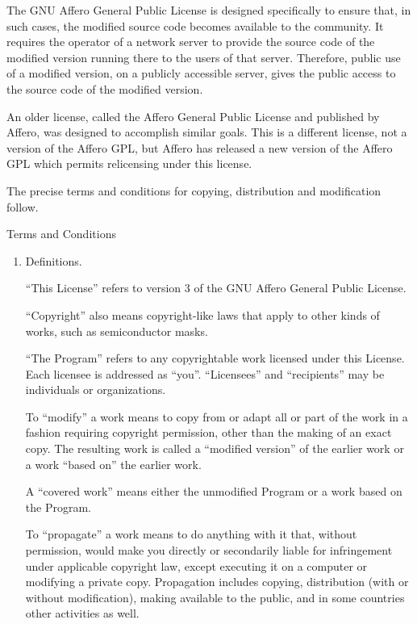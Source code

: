 \documentclass[10pt,a4paper,ngerman,titlepage,tocindentauto]{article}
\begin{document}
\begin{multicols}{3}
{						The GNU Affero General Public License is designed specifically to
						ensure that, in such cases, the modified source code becomes available
						to the community.  It requires the operator of a network server to
						provide the source code of the modified version running there to the
						users of that server.  Therefore, public use of a modified version, on
						a publicly accessible server, gives the public access to the source
						code of the modified version.

						An older license, called the Affero General Public License and
						published by Affero, was designed to accomplish similar goals.  This is
						a different license, not a version of the Affero GPL, but Affero has
						released a new version of the Affero GPL which permits relicensing under
						this license.

						The precise terms and conditions for copying, distribution and
						modification follow.

						\begin{center}
						{\sc Terms and Conditions}
						\end{center}

						\begin{enumerate}

						\addtocounter{enumi}{-1}

						\item Definitions.

						``This License'' refers to version 3 of the GNU Affero General Public License.

						``Copyright'' also means copyright-like laws that apply to other kinds of
						works, such as semiconductor masks.

						``The Program'' refers to any copyrightable work licensed under this
						License.  Each licensee is addressed as ``you''.  ``Licensees'' and
						``recipients'' may be individuals or organizations.

						To ``modify'' a work means to copy from or adapt all or part of the work
						in a fashion requiring copyright permission, other than the making of an
						exact copy.  The resulting work is called a ``modified version'' of the
						earlier work or a work ``based on'' the earlier work.

						A ``covered work'' means either the unmodified Program or a work based
						on the Program.

						To ``propagate'' a work means to do anything with it that, without
						permission, would make you directly or secondarily liable for
						infringement under applicable copyright law, except executing it on a
						computer or modifying a private copy.  Propagation includes copying,
						distribution (with or without modification), making available to the
						public, and in some countries other activities as well.


\end{enumerate}}
\end{multicols}
\end{document}
